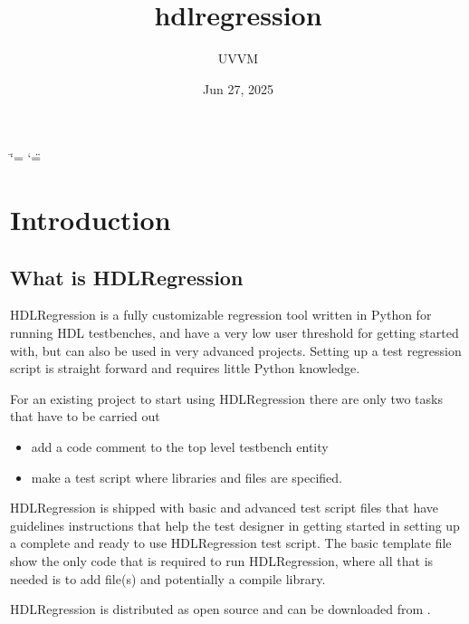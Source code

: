 \documentclass[letterpaper,10pt,english]{sphinxmanual}
\title{hdlregression}
\date{Jun 27, 2025}
\author{UVVM}
\begin{document}
\ifdefined\shorthandoff
  \ifnum\catcode`\=\string=\active\shorthandoff{=}\fi
  \ifnum\catcode`\"=\active{}\fi
\fi

\pagestyle{empty}
\sphinxmaketitle
\pagestyle{plain}
\sphinxtableofcontents
\pagestyle{normal}
\label{\detokenize{index::doc}}


\sphinxstepscope


\chapter{Introduction}
\label{\detokenize{intro:introduction}}\label{\detokenize{intro::doc}}

\section{What is HDLRegression}
\label{\detokenize{intro:what-is-hdlregression}}
\sphinxAtStartPar
HDLRegression is a fully customizable regression tool written in Python for running HDL testbenches, and have a
very low user threshold for getting started with, but can also be used in very advanced projects.
Setting up a test regression script is straight forward and requires little Python knowledge.

\sphinxAtStartPar
For an existing project to start using HDLRegression there are only two tasks that have to be carried out
\begin{itemize}
\item {} 
 \sphinxhyphen{} add a code comment to the top level testbench entity

\item {} 
 \sphinxhyphen{} make a test script where libraries and files are specified.

\end{itemize}

\sphinxAtStartPar
HDLRegression is shipped with basic and advanced test script {\hyperref[\detokenize{templates::doc}]{}} files that have guidelines instructions that help the
test designer in getting started in setting up a complete and ready to use HDLRegression test script.
The basic template file show the only code that is required to run HDLRegression, where all that is needed is to add file(s)
and potentially a compile library.

\sphinxAtStartPar
HDLRegression is distributed as open source and can be downloaded from .
\end{document}
